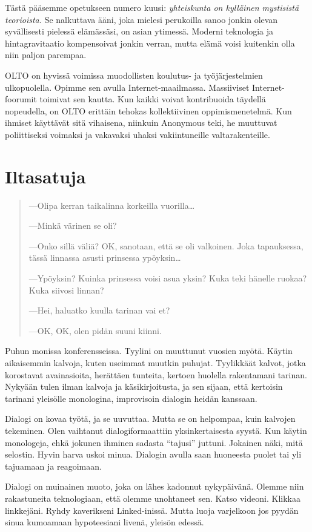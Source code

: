 Tästä pääsemme opetukseen numero kuusi: \emph{yhteiskunta on kylläinen mystisistä teorioista.} Se nalkuttava ääni, joka mielesi perukoilla sanoo jonkin olevan syvällisesti pielessä elämässäsi, on asian ytimessä. Moderni teknologia ja hintagravitaatio kompensoivat jonkin verran, mutta elämä voisi kuitenkin olla niin paljon parempaa.

OLTO on hyvissä voimissa muodollisten koulutus- ja työjärjestelmien ulkopuolella. Opimme sen avulla Internet-maailmassa. Massiiviset Internet-foorumit toimivat sen kautta. Kun kaikki voivat kontribuoida täydellä nopeudella, on OLTO erittäin tehokas kollektiivinen oppimismenetelmä. Kun ihmiset käyttävät sitä vihaisena, niinkuin Anonymous teki, he muuttuvat poliittiseksi voimaksi ja vakavaksi uhaksi vakiintuneille valtarakenteille.

\section{Iltasatuja}
\begin{quotation}
---Olipa kerran taikalinna korkeilla vuorilla\ldots

---Minkä värinen se oli?

---Onko sillä väliä? OK, sanotaan, että se oli valkoinen. Joka tapauksessa, tässä linnassa asusti prinsessa ypöyksin\ldots

---Ypöyksin? Kuinka prinsessa voisi asua yksin? Kuka teki hänelle ruokaa? Kuka siivosi linnan?

---Hei, haluatko kuulla tarinan vai et?

---OK, OK, olen pidän suuni kiinni.
\end{quotation}
Puhun monissa konferensseissa. Tyylini on muuttunut vuosien myötä. Käytin aikaisemmin kalvoja, kuten useimmat muutkin puhujat. Tyylikkäät kalvot, jotka korostavat avainasioita, herättäen tunteita, kertoen huolella rakentamani tarinan. Nykyään tulen ilman kalvoja ja käsikirjoitusta, ja sen sijaan, että kertoisin tarinani yleisölle monologina, improvisoin dialogin heidän kanssaan.

Dialogi on kovaa työtä, ja se uuvuttaa. Mutta se on helpompaa, kuin kalvojen tekeminen. Olen vaihtanut dialogiformaattiin yksinkertaisesta syystä. Kun käytin monologeja, ehkä jokunen ihminen sadasta ``tajusi'' juttuni. Jokainen näki, mitä selostin. Hyvin harva uskoi minua. Dialogin avulla saan huoneesta puolet tai yli tajuamaan ja reagoimaan.

Dialogi on muinainen muoto, joka on lähes kadonnut nykypäivänä. Olemme niin rakastuneita teknologiaan, että olemme unohtaneet sen. Katso videoni. Klikkaa linkkejäni. Ryhdy kaverikseni Linked-inissä. Mutta luoja varjelkoon jos pyydän sinua kumoamaan hypoteesiani livenä, yleisön edessä. 

